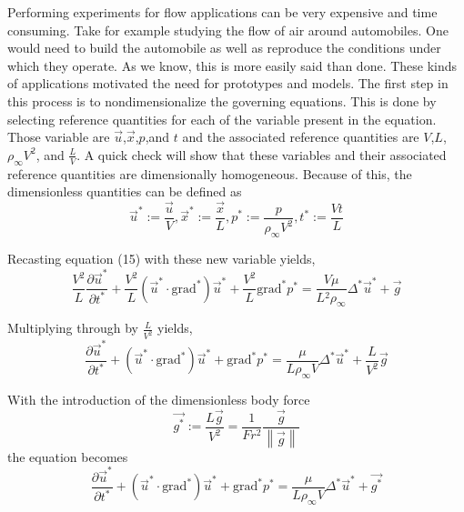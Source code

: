 Performing experiments for flow applications can be very expensive and time consuming. Take for example studying the flow of air around automobiles. One would need to build the automobile as well as reproduce the conditions under which they operate. As we know, this is more easily said than done. These kinds of applications motivated the need for prototypes and models. The first step in this process is to nondimensionalize the governing equations. This is done by selecting reference quantities for each of the variable present in the equation. Those variable are $\stackrel{\rightarrow}{u}$,$\stackrel{\rightarrow}{x}$,$p$,and $t$ and the associated reference quantities are $V$,$L$,$\rho_{\infty}V^2$, and $\displaystyle{\frac{L}{V}}$. A quick check will show that these variables and their associated reference quantities are dimensionally homogeneous. Because of this, the dimensionless quantities can be defined as \begin{equation} \stackrel{\rightarrow}{u}^* := \frac{\stackrel{\rightarrow}{u}}{V}, \stackrel{\rightarrow}{x}^* := \frac{\stackrel{\rightarrow}{x}}{L}, p^* := \frac{p}{\rho_{\infty}V^2}, t^* := \frac{Vt}{L} \end{equation}

Recasting equation (15) with these new variable yields, \begin{equation} \frac{V^2}{L}\frac{\partial \stackrel{\rightarrow}{u}^*}{\partial t^*} + \frac{V^2}{L}(\stackrel{\rightarrow}{u}^* \cdot \mbox{grad}^*)\stackrel{\rightarrow}{u}^* + \frac{V^2}{L}\mbox{grad}^* p^* = \frac{V\mu}{L{^2}\rho_{\infty}} \Delta^* \stackrel{\rightarrow}{u}^* + \stackrel{\rightarrow}{g} \end{equation}

Multiplying through by $\displaystyle{\frac{L}{V^2}}$ yields, \begin{equation} \frac{\partial \stackrel{\rightarrow}{u}^*}{\partial t^*} + (\stackrel{\rightarrow}{u}^* \cdot \mbox{grad}^*)\stackrel{\rightarrow}{u}^* + \mbox{grad}^* p^* = \frac{\mu}{L\rho_{\infty}V} \Delta^* \stackrel{\rightarrow}{u}^* + \frac{L}{V^2} \stackrel{\rightarrow}{g} \end{equation}

With the introduction of the dimensionless body force \begin{equation} \stackrel{\rightarrow}{g^{*}} := \frac{L \stackrel{\rightarrow}{g}}{V^2} = \frac{1}{Fr^2}\frac{\stackrel{\rightarrow}{g}}{\left\|\stackrel{\rightarrow}{g}\right\|} \end{equation} the equation becomes \begin{equation} \label{dmome}\frac{\partial \stackrel{\rightarrow}{u}^*}{\partial t^*} + (\stackrel{\rightarrow}{u}^* \cdot \mbox{grad}^*)\stackrel{\rightarrow}{u}^* + \mbox{grad}^* p^* = \frac{\mu}{L\rho_{\infty}V} \Delta^* \stackrel{\rightarrow}{u}^* + \stackrel{\rightarrow}{g^{*}} \end{equation}

